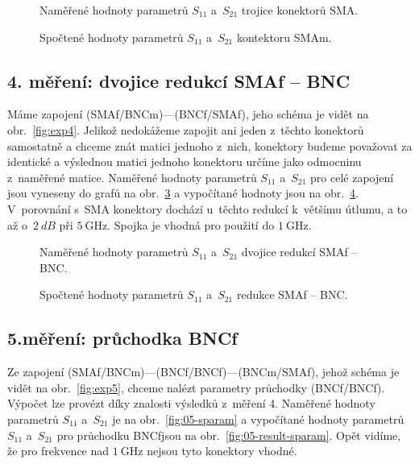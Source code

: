 \documentclass{protokol}
\newcommand\sparam{S}
\newcommand\male{m}
\newcommand\female{f}
\newcommand\connector[2]{#1 -- #2}
\begin{document}
\begin{figure}[htp]
	\centering
	
	
	\caption{Naměřené hodnoty parametrů $\sparam_{11}$ a~$\sparam_{21}$
		trojice konektorů SMA.}
	\label{fig:03-sparam}
\end{figure}

\begin{figure}[htp]
	\centering
	
	
	\caption{Spočtené hodnoty parametrů $\sparam_{11}$ a~$\sparam_{21}$
		kontektoru SMA\male.}
	\label{fig:03-result-sparam}
\end{figure}

\subsection{4. měření: dvojice redukcí \connector{SMA\female}{BNC}}
Máme zapojení (SMAf/BNCm)---(BNCf/SMAf),
jeho schéma je vidět na obr.~\ref{fig:exp4}.
Jelikož nedokážeme zapojit ani jeden z~těchto konektorů samostatně
a chceme znát matici jednoho z~nich,
konektory budeme považovat za identické a výslednou matici
jednoho konektoru určíme jako odmocninu z~naměřené matice.
Naměřené hodnoty parametrů $\sparam_{11}$ a~$\sparam_{21}$ pro celé zapojení 
jsou vyneseny do grafů na obr.~\ref{fig:04-sparam} a vypočítané hodnoty jsou na 
obr.~\ref{fig:04-result-sparam}. V~porovnání s~SMA konektory dochází u~těchto 
redukcí k~většímu útlumu, a to až o~$\SI{2}{dB}$ při $\SI{5}{\giga\hertz}$. 
Spojka je vhodná pro použití do $\SI{1}{\giga\hertz}$.

\begin{figure}[htp]
	\centering
	
	
	\caption{Naměřené hodnoty parametrů $\sparam_{11}$ a~$\sparam_{21}$
		dvojice redukcí \connector{SMA\female}{BNC}.}
	\label{fig:04-sparam}
\end{figure}

\begin{figure}[htp]
	\centering
	
	
	\caption{Spočtené hodnoty parametrů $\sparam_{11}$ a~$\sparam_{21}$
		redukce \connector{SMA\female}{BNC}.}
	\label{fig:04-result-sparam}
\end{figure}

\subsection{5.měření: průchodka BNC\female}
Ze zapojení (SMAf/BNCm)---(BNCf/BNCf)---(BNCm/SMAf),
jehož schéma je vidět na obr.~\ref{fig:exp5},
chceme nalézt parametry průchodky (BNCf/BNCf).
Výpočet lze provézt díky znalosti výsledků z~měření 4. Naměřené hodnoty 
parametrů $\sparam_{11}$ a~$\sparam_{21}$ je na obr.~\ref{fig:05-sparam} a 
vypočítané hodnoty parametrů $\sparam_{11}$ a~$\sparam_{21}$ pro průchodku 
BNC\female jsou na obr.~\ref{fig:05-result-sparam}. Opět vidíme, že pro 
frekvence nad $\SI{1}{\giga\hertz}$ nejsou tyto konektory vhodné.
\end{document}

